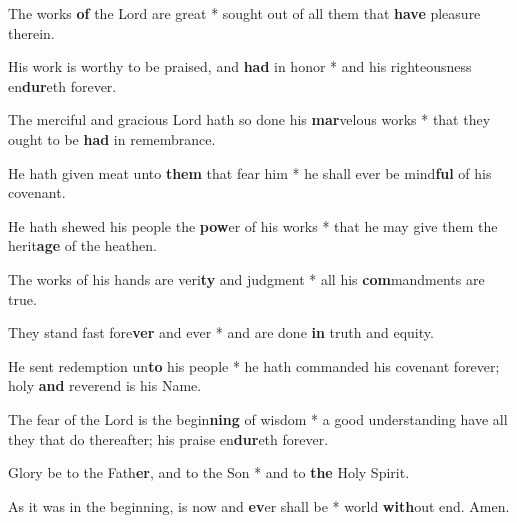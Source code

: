 \begin{multicols}{2}
	The works \textbf{of} the Lord are great * sought out of all them that \textbf{have} pleasure therein.
	
	His work is worthy to be praised, and \textbf{had} in honor * and his righteousness en\textbf{dur}eth forever.
	
	The merciful and gracious Lord hath so done his \textbf{mar}velous works * that they ought to be \textbf{had} in remembrance.
	
	He hath given meat unto \textbf{them} that fear him * he shall ever be mind\textbf{ful} of his covenant.
	
	He hath shewed his people the \textbf{pow}er of his works * that he may give them the herit\textbf{age} of the heathen.
	
	The works of his hands are veri\textbf{ty} and judgment * all his \textbf{com}mandments are true.
	
	They stand fast fore\textbf{ver} and ever * and are done \textbf{in} truth and equity.
	
	He sent redemption un\textbf{to} his people * he hath commanded his covenant forever; holy \textbf{and} reverend is his Name.
	
	The fear of the Lord is the begin\textbf{ning} of wisdom * a good understanding have all they that do thereafter; his praise en\textbf{dur}eth forever.
	
	Glory be to the Fath\textbf{er}, and to the Son * and to \textbf{the} Holy Spirit.
	
	As it was in the beginning, is now and \textbf{ev}er shall be * world \textbf{with}out end. Amen.
\end{multicols}